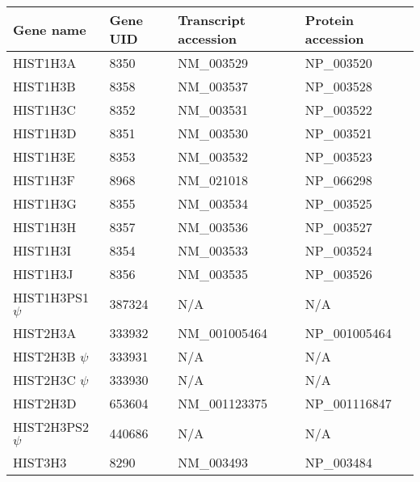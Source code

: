\begin{tabular}{l | l | l | l }
  Gene name & Gene UID & Transcript accession & Protein accession \\
  \hline
   HIST1H3A & 8350 & NM\_003529 & NP\_003520 \\
   HIST1H3B & 8358 & NM\_003537 & NP\_003528 \\
   HIST1H3C & 8352 & NM\_003531 & NP\_003522 \\
   HIST1H3D & 8351 & NM\_003530 & NP\_003521 \\
   HIST1H3E & 8353 & NM\_003532 & NP\_003523 \\
   HIST1H3F & 8968 & NM\_021018 & NP\_066298 \\
   HIST1H3G & 8355 & NM\_003534 & NP\_003525 \\
   HIST1H3H & 8357 & NM\_003536 & NP\_003527 \\
   HIST1H3I & 8354 & NM\_003533 & NP\_003524 \\
   HIST1H3J & 8356 & NM\_003535 & NP\_003526 \\
   HIST1H3PS1 $\psi$ & 387324 & N/A & N/A \\
   HIST2H3A & 333932 & NM\_001005464 & NP\_001005464 \\
   HIST2H3B $\psi$ & 333931 & N/A & N/A \\
   HIST2H3C $\psi$ & 333930 & N/A & N/A \\
   HIST2H3D & 653604 & NM\_001123375 & NP\_001116847 \\
   HIST2H3PS2 $\psi$ & 440686 & N/A & N/A \\
   HIST3H3 & 8290 & NM\_003493 & NP\_003484 \\
\end{tabular}
